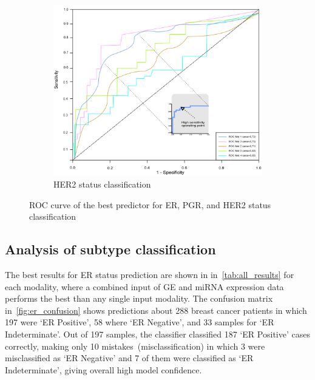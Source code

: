 \begin{figure}
\begin{subfigure}{0.49\linewidth}
		\includegraphics[width=0.9\linewidth]{images/roc_her2.png}
		\caption{HER2 status classification }
        \label{fig:her2_roc}
	\end{subfigure}
	\caption{ROC curve of the best predictor for ER, PGR, and HER2 status classification~\cite{karimACCESS2019}} 
	\label{fig:roc_all}
\end{figure}

\subsection{Analysis of subtype classification}
The best results for ER status prediction are shown in in~\cref{tab:all_results} for each modality, where a combined input of GE and miRNA expression data performs the best than any single input modality. The confusion matrix in~\cref{fig:er_confusion} shows predictions about 288 breast cancer patients in which 197 were `ER Positive', 58 where `ER Negative', and 33 samples for `ER Indeterminate'. Out of 197 samples, the classifier classified 187 `ER Positive' cases correctly, making only 10 mistakes~(misclassification) in which 3 were misclassified as `ER Negative' and 7 of them were classified as `ER Indeterminate', giving overall high model confidence. 

